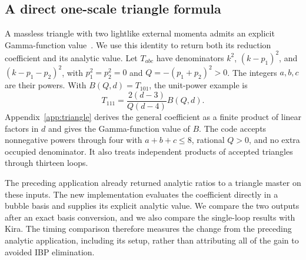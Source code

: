 \subsection{A direct one-scale triangle formula}
A massless triangle with two lightlike external momenta admits an explicit Gamma-function value~\cite{DavydychevOsland1998}. We use this identity to return both its reduction coefficient and its analytic value. Let $T_{abc}$ have denominators $k^2$, $(k-p_1)^2$, and $(k-p_1-p_2)^2$, with $p_1^2=p_2^2=0$ and $Q=-(p_1+p_2)^2>0$. The integers $a,b,c$ are their powers. With $B(Q,d)=T_{101}$, the unit-power example is
\begin{equation}
 T_{111}=\frac{2(d-3)}{Q(d-4)}B(Q,d).
 \label{eq:triangle-main}
\end{equation}
Appendix~\ref{app:triangle} derives the general coefficient as a finite product of linear factors in $d$ and gives the Gamma-function value of $B$. The code accepts nonnegative powers through four with $a+b+c\leq8$, rational $Q>0$, and no extra occupied denominator. It also treats independent products of accepted triangles through thirteen loops.

The preceding application already returned analytic ratios to a triangle master on these inputs. The new implementation evaluates the coefficient directly in a bubble basis and supplies its explicit analytic value. We compare the two outputs after an exact basis conversion, and we also compare the single-loop results with Kira. The timing comparison therefore measures the change from the preceding analytic application, including its setup, rather than attributing all of the gain to avoided IBP elimination.
